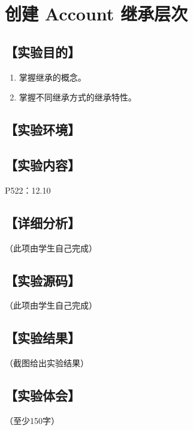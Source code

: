 \section{创建 Account 继承层次}
\hfill{}
\subsection*{【实验目的】}
\begin{enumerate}[topsep=0pt,partopsep=0pt,itemsep=0pt,parsep=0pt,label={\arabic*、}]
\item 掌握继承的概念。
\item 掌握不同继承方式的继承特性。
\end{enumerate}
\subsection*{【实验环境】}
\MyEnvironment
\subsection*{【实验内容】}
P522：12.10
\subsection*{【详细分析】}
（此项由学生自己完成）
\subsection*{【实验源码】}
（此项由学生自己完成）
\subsection*{【实验结果】}
（截图给出实验结果）
\subsection*{【实验体会】}
（至少150字）
